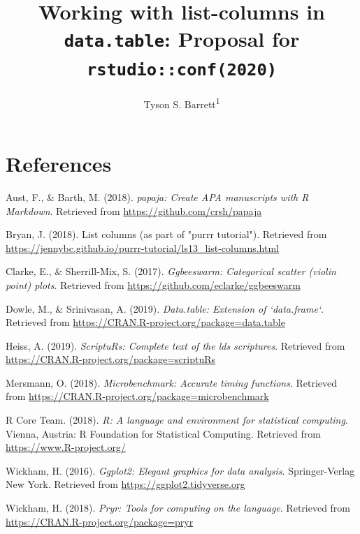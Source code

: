 \documentclass[doc]{apa6}
\title{Working with list-columns in \texttt{data.table}: Proposal for \texttt{rstudio::conf(2020)}}
\author{Tyson S. Barrett\textsuperscript{1}}
\date{}
\affiliation{
\vspace{0.5cm}
\textsuperscript{1} Utah State University}
\begin{document}
\maketitle

\hypertarget{references}{%
\section{References}\label{references}}

\begingroup
\setlength{\parindent}{-0.5in}
\setlength{\leftskip}{0.5in}

\hypertarget{refs}{}
\leavevmode\hypertarget{ref-R-papaja}{}%
Aust, F., \& Barth, M. (2018). \emph{papaja: Create APA manuscripts with R Markdown}. Retrieved from \url{https://github.com/crsh/papaja}

\leavevmode\hypertarget{ref-jenny}{}%
Bryan, J. (2018). List columns (as part of "purrr tutorial"). Retrieved from \url{https://jennybc.github.io/purrr-tutorial/ls13_list-columns.html}

\leavevmode\hypertarget{ref-R-ggbeeswarm}{}%
Clarke, E., \& Sherrill-Mix, S. (2017). \emph{Ggbeeswarm: Categorical scatter (violin point) plots}. Retrieved from \url{https://github.com/eclarke/ggbeeswarm}

\leavevmode\hypertarget{ref-R-data.table}{}%
Dowle, M., \& Srinivasan, A. (2019). \emph{Data.table: Extension of `data.frame`}. Retrieved from \url{https://CRAN.R-project.org/package=data.table}

\leavevmode\hypertarget{ref-R-scriptuRs}{}%
Heiss, A. (2019). \emph{ScriptuRs: Complete text of the lds scriptures}. Retrieved from \url{https://CRAN.R-project.org/package=scriptuRs}

\leavevmode\hypertarget{ref-R-microbenchmark}{}%
Mersmann, O. (2018). \emph{Microbenchmark: Accurate timing functions}. Retrieved from \url{https://CRAN.R-project.org/package=microbenchmark}

\leavevmode\hypertarget{ref-R-base}{}%
R Core Team. (2018). \emph{R: A language and environment for statistical computing}. Vienna, Austria: R Foundation for Statistical Computing. Retrieved from \url{https://www.R-project.org/}

\leavevmode\hypertarget{ref-R-ggplot2}{}%
Wickham, H. (2016). \emph{Ggplot2: Elegant graphics for data analysis}. Springer-Verlag New York. Retrieved from \url{https://ggplot2.tidyverse.org}

\leavevmode\hypertarget{ref-R-pryr}{}%
Wickham, H. (2018). \emph{Pryr: Tools for computing on the language}. Retrieved from \url{https://CRAN.R-project.org/package=pryr}
\end{document}
